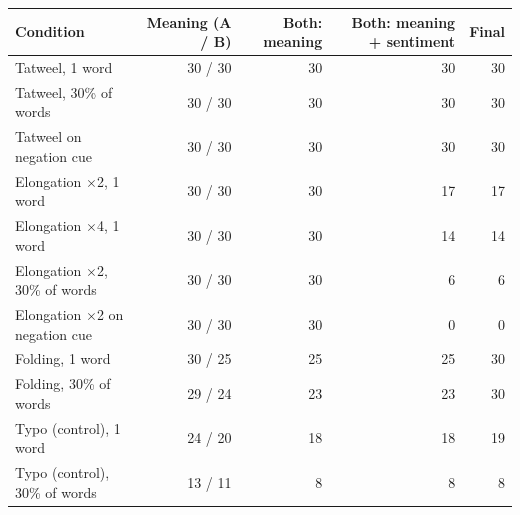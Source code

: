 \begin{tabular}{lrrrr}
\toprule
Condition & Meaning (A / B) & Both: meaning & Both: meaning + sentiment & Final \\
\midrule
Tatweel, 1 word & 30 / 30 & 30 & 30 & 30 \\
Tatweel, 30\% of words & 30 / 30 & 30 & 30 & 30 \\
Tatweel on negation cue & 30 / 30 & 30 & 30 & 30 \\
Elongation $\times$2, 1 word & 30 / 30 & 30 & 17 & 17 \\
Elongation $\times$4, 1 word & 30 / 30 & 30 & 14 & 14 \\
Elongation $\times$2, 30\% of words & 30 / 30 & 30 & 6 & 6 \\
Elongation $\times$2 on negation cue & 30 / 30 & 30 & 0 & 0 \\
Folding, 1 word & 30 / 25 & 25 & 25 & 30 \\
Folding, 30\% of words & 29 / 24 & 23 & 23 & 30 \\
Typo (control), 1 word & 24 / 20 & 18 & 18 & 19 \\
Typo (control), 30\% of words & 13 / 11 & 8 & 8 & 8 \\
\bottomrule
\end{tabular}
